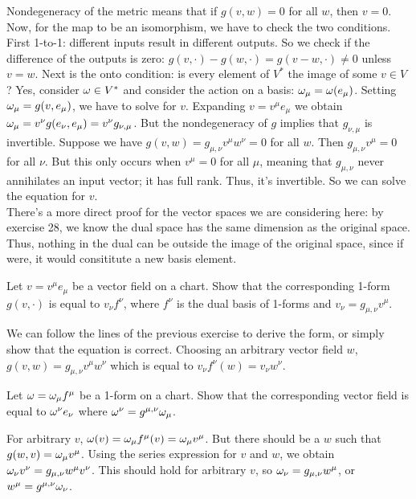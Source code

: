 Nondegeneracy of the metric means that if $g(v,w)=0$ for all $w$, then $v=0$. Now, for the map to be an isomorphism, we have to 
check the two conditions. First 1-to-1: different inputs result in different outputs. So we check if the difference of the 
outputs is zero: $g(v,\cdot)-g(w,\cdot)=g(v-w,\cdot)\neq 0$ unless $v=w$. Next is the onto condition: is every element of $V^*$ the image
of some $v\in V$? Yes, consider $\omega\in V^*$ and consider the action on a basis: $\omega_\mu=\omega(e_\mu)$. Setting $\omega_\mu=g(v,e_\mu)$, 
we have to solve for $v$. Expanding $v=v^\mu e_\mu$ we obtain $\omega_\mu=v^\nu g(e_\nu,e_\mu)=v^\nu g_{\nu,\mu}$. But
the nondegeneracy of $g$ implies that $g_{\nu,\mu}$ is invertible. Suppose we have $g(v,w)=g_{\mu,\nu}v^\mu w^\nu=0$ for all $w$. Then
$g_{\mu,\nu}v^\mu=0$ for all $\nu$. But this only occurs when $v^\mu=0$ for all $\mu$, meaning that $g_{\mu,\nu}$ never annihilates
an input vector; it has full rank. Thus, it's invertible.  So we can solve the equation for $v$.\\

There's a more direct proof for the vector spaces we are considering here: by exercise 28, we know the dual space
has the same dimension as the original space. Thus, nothing in the dual can be outside the image of the original space, since if
were, it would consititute a new basis element.

\begin{p}{Let $v=v^\mu e_\mu$ be a vector field on a chart. Show that the corresponding 1-form $g(v,\cdot)$ is equal to $v_\nu f^\nu$, where $f^\nu$ is the dual basis of 1-forms and $v_\nu=g_{\mu,\nu}v^\mu$.}\end{p}

We can follow the lines of the previous exercise to derive the form, or simply show that the equation is correct. Choosing an 
arbitrary vector field $w$, $g(v,w)=g_{\mu,\nu}v^\mu w^\nu$ which is equal to $v_\nu f^\nu(w)=v_\nu w^\nu$.

\begin{p}{Let $\omega=\omega_\mu f^\mu$ be a 1-form on a chart. Show that the corresponding vector field is equal to
$\omega^\nu e_\nu$ where $\omega^\nu=g^{\mu,\nu}\omega_\mu$.}\end{p}

For arbitrary $v$, $\omega(v)=\omega_\mu f^\mu(v)=\omega_\mu v^\mu$. But there should be a $w$ such that $g(w,v)=\omega_\mu v^\mu$. 
Using the series expression for $v$ and $w$, we obtain $\omega_\nu v^\nu=g_{\mu,\nu}w^\mu v^\nu$. This should hold for arbitrary $v$,
so $\omega_\nu=g_{\mu,\nu}w^\mu$, or $w^\mu=g^{\mu,\nu}\omega_\nu$.

